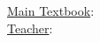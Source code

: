 \documentclass[11 pt, twoside]{article}
\begin{document}
\title{}
\author{Avery Karlin}
\date{}

\maketitle
\newpage
\tableofcontents
\vspace{11pt}
\noindent
\underline{Main Textbook}: \\
\underline{Teacher}:
\newpage
\end{document}
